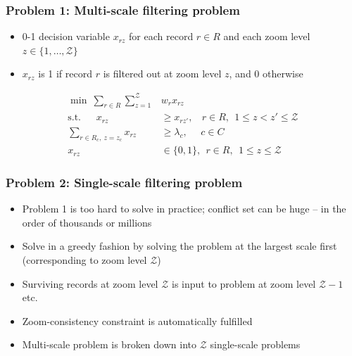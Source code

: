 \documentclass{beamer}
\begin{document}
\frame
{
  \frametitle{Problem 1: Multi-scale filtering problem}
  \begin{itemize}
  \item 0-1 decision variable $x_{rz}$ for each record $r \in R$ and each zoom level $z \in \lbrace 1, \dots, \mathcal{Z} \rbrace$
  \item $x_{rz}$ is 1 if record $r$ is filtered out at zoom level $z$, and 0 otherwise
  \end{itemize}
\begin{align}
  \label{eq:objective}
  \min ~\sum_{r \in R} \sum_{z=1}^\mathcal{Z} &w_r x_{rz} \\
  \label{eq:zoom-consistency}
  \mbox{s.t.}~~~~~~~x_{rz} &\geq x_{rz'}, ~~~~r \in R, ~~1 \leq z < z' \leq \mathcal{Z} \\
  \label{eq:general-constraints}
  \sum_{r \in R_c, ~z = z_c} x_{rz} &\geq \lambda_c, ~~~~~~ c \in C \\
  x_{rz} & \in \{0, 1\}, ~~ r \in R, ~~1 \leq z \leq \mathcal{Z}
\end{align}
  
}


\frame
{
  \frametitle{Problem 2: Single-scale filtering problem}
  
  \begin{itemize}
  \item Problem 1 is too hard to solve in practice; conflict set can be huge -- in the order of thousands or millions
  \item Solve in a greedy fashion by solving the problem at the largest scale first (corresponding to zoom level $\mathcal{Z}$)
  \item Surviving records at zoom level $\mathcal{Z}$ is input to problem at zoom level $\mathcal{Z} -1$ etc.
  \item Zoom-consistency constraint is automatically fulfilled
  \item Multi-scale problem is broken down into $\mathcal{Z}$ single-scale problems
  \end{itemize}
}
\end{document}

